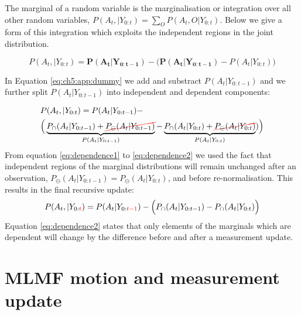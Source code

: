 \begin{appendices}
The marginal of a random variable is the marginalisation or integration over all other random variables, $P(A_t,|Y_{0:t}) = \sum\limits_{O} P(A_t,O|Y_{0:t})$. Below 
we give a form of this integration which exploits the independent regions in the joint distribution.

\begin{equation} \label{eq:ch5:app:dummy}
 P(A_t,|Y_{0:t}) = \mathbf{P(A_t|Y_{0:t-1})} - \Big(\mathbf{P(A_t|Y_{0:t-1})} - P(A_t|Y_{0:t}) \Big) 
\end{equation}

In Equation \ref{eq:ch5:app:dummy} we add and substract $P(A_t|Y_{0:t-1})$ and we further split 
$P(A_t|Y_{0:t-1})$ into independent and dependent components: 

\begin{align}
  &P(A_t,|Y_{0:t}) =  P(A_t|Y_{0:t-1}) - \nonumber \\ 
  &\Big(\underbrace{P_{\cap}(A_t|Y_{0:t-1}) + \Ccancel[red]{P_{\ominus}(A_t|Y_{0:t-1})}}_{P(A_t|Y_{0:t-1})} -  \underbrace{P_{\cap}(A_t|Y_{0:t}) + \Ccancel[red]{P_{\ominus}(A_t|Y_{0:t})}}_{P(A_t|Y_{0:t})})   \Big) \label{eq:dependence1} 
\end{align}
From equation \ref{eq:dependence1} to \ref{eq:dependence2} we used the fact that independent regions of the marginal distributions will remain unchanged after
an observation, $P_{\ominus}(A_t|Y_{0:t-1}) = P_{\ominus}(A_t|Y_{0:t})$, and before re-normalisation. This results in the final recursive update:
\begin{equation}
 P(A_t,|Y_{0:\color{red}{t}}) =  P(A_t|Y_{0:\color{red}{t-1}}) - \Big(P_{\cap}(A_t|Y_{0:t-1}) -  P_{\cap}(A_t|Y_{0:t})  \Big) \label{eq:dependence2} 
\end{equation}
Equation \ref{eq:dependence2} states that only elements of the marginals which are dependent will change by the difference
before and after a measurement update.

\section{MLMF motion and measurement update}\label{appendix:ch5:mlmf_update}


\end{appendices}
